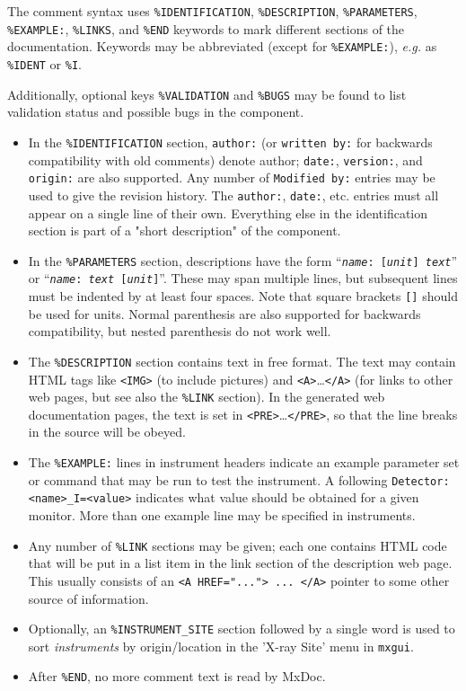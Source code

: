 The comment syntax uses \verb+%IDENTIFICATION+, \verb+%DESCRIPTION+,
\verb+%PARAMETERS+, \verb+%EXAMPLE:+, \verb+%LINKS+, and \verb+%END+
keywords to mark different sections of the documentation. Keywords may
be abbreviated (except for \verb+%EXAMPLE:+), \textit{e.g.} as \verb+%IDENT+ or \verb+%I+.

Additionally, optional keys \verb+%VALIDATION+ and \verb+%BUGS+ may be found to list validation status and possible bugs in the component.

\begin{itemize}
\item In the \verb+%IDENTIFICATION+
  section, \verb+author:+ (or \verb+written by:+ for backwards
  compatibility with old comments) denote author; \verb+date:+,
  \verb+version:+, and \verb+origin:+ are also supported. Any number of
  \verb+Modified by:+ entries may be used to give the revision history.
  The \verb+author:+, \verb+date:+, etc. entries must all
  appear on a single line of their own. Everything else in the
  identification section is part of a "short description" of the
  component.
\item In the \verb+%PARAMETERS+
  section, descriptions have the form
  \hbox{``\texttt{\textit{name\/}:~[\textit{unit\/}] \textit{text\/}}''}
  or \hbox{``\texttt{\textit{name\/}:~\textit{text\/} [\textit{unit\/}]}''}.
  These may span multiple lines, but subsequent lines must be
  indented by at least four spaces. Note that square brackets \verb+[]+ should
  be used for units. Normal parenthesis are also supported for backwards
  compatibility, but nested parenthesis do not work well.
\item The \verb+%DESCRIPTION+
  section contains text in free format. The text may contain HTML tags
  like \verb+<IMG>+ (to include pictures) and
  \verb+<A>+\ldots\verb+</A>+
  (for links to other web pages, but see also the \verb+%LINK+
  section). In the generated web documentation pages, the text is set in
  \verb+<PRE>+\ldots\verb+</PRE>+, so that the line breaks in the source
  will be obeyed.
\item The \verb+%EXAMPLE:+
  lines in instrument headers indicate an example parameter set or command that may be
  run to test the instrument. A following \verb+Detector: <name>_I=<value>+
  indicates what value should be obtained for a given monitor. More than one example 
  line may be specified in instruments.
\item Any number of \verb+%LINK+
  sections may be given; each one contains HTML code that will be put in
  a list item in the link section of the description web page. This
  usually consists of an \verb+<A HREF="..."> ... </A>+ pointer to some
  other source of information.
\item Optionally, an \verb+%INSTRUMENT_SITE+ section followed by a single word is used to sort \emph{instruments} by origin/location in the 'X-ray Site' menu in \verb+mxgui+.
\item After \verb+%END+, no more comment text is read by MxDoc.
\end{itemize}
